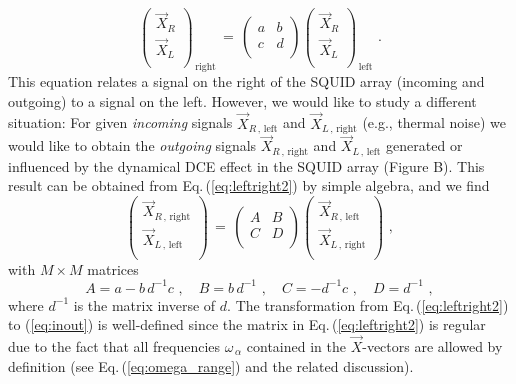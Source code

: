 %
\begin{equation} \label{eq:leftright2}
\begin{pmatrix}
\vec{X}_R \\
\vec{X}_L \\
\end{pmatrix}_{\, \text{right}} \, = \,
\begin{pmatrix}
a & b \\
c & d \\
\end{pmatrix}
\begin{pmatrix}
\vec{X}_R \\
\vec{X}_L \\
\end{pmatrix}_{\, \text{left}} \, \, .
\end{equation}
%
This equation relates a signal on the right of the SQUID array (incoming and outgoing)
to a signal on the left. However, we would like to study a different situation: For given
{\em incoming} signals $\vec{X}_{R\,,\,\text{left}}$ and $\vec{X}_{L\,,\,\text{right}}$ 
(e.g., thermal noise) we would like to obtain the {\em outgoing} signals 
$\vec{X}_{R\,,\,\text{right}}$ and $\vec{X}_{L\,,\,\text{left}}$ generated or influenced 
by the dynamical DCE effect in the SQUID array 
%
\color{red}
(Figure B).
\color{black}
%
This result can be obtained from Eq.\,(\ref{eq:leftright2}) by simple algebra, 
and we find
%
\begin{equation} \label{eq:inout}
\begin{pmatrix}
\vec{X}_{R\,,\,\text{right}} \\
\vec{X}_{L\,,\,\text{left}} \\
\end{pmatrix} \, = \,
\begin{pmatrix}
A & B \\
C & D \\
\end{pmatrix}
\begin{pmatrix}
\vec{X}_{R\,,\,\text{left}} \\
\vec{X}_{L\,,\,\text{right}} \\
\end{pmatrix} \, \, ,
\end{equation}
%
with $M \times M$ matrices
%
\begin{equation} \label{eq:bigabcd}
A = a - b \, d^{-1} c \, \, , \quad B = b \, d^{-1}  \, \, , \quad
C = - d^{-1} c \, \, , \quad D = d^{-1} \, \, ,
\end{equation}
%
where $d^{-1}$ is the matrix inverse of $d$. 
The transformation from Eq.\,(\ref{eq:leftright2}) to (\ref{eq:inout}) is 
well-defined since the matrix in Eq.\,(\ref{eq:leftright2}) is regular
due to the fact that all frequencies $\omega_{\,\alpha}$ contained in the 
$\vec{X}$-vectors are allowed 
by definition (see Eq.\,(\ref{eq:omega_range}) and the related discussion). 

